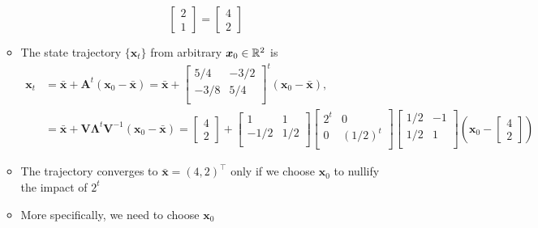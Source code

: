 \documentclass[12pt,a4paper]{article}
\begin{document}
\begin{itemize}
\begin{itemize}
\begin{equation}
\begin{bmatrix}
        2 \\
        1
      \end{bmatrix}
      =
      \begin{bmatrix}
        4 \\
        2
      \end{bmatrix}
    \end{equation}
  \item The state trajectory $\{\bm{x}_{t}\}$ from arbitrary $\bm{x}_{0}\in \mathbb{R}^{2}$ is
    \begin{align}
      \bm{x}_{t}
      & = \bar{\bm{x}} + \bm{A}^{t}(\bm{x}_{0}-\bar{\bm{x}})
        = \bar{\bm{x}} +
        \begin{bmatrix}
          5/4 & -3/2 \\
          -3/8 & 5/4 \\
        \end{bmatrix}^{t}        
        (\bm{x}_{0}-\bar{\bm{x}}),
        \nonumber \\
        & =
        \bar{\bm{x}}
        +
        \bm{V}\bm{\Lambda}^{t}\bm{V}^{-1}(\bm{x}_{0}-\bar{\bm{x}})
        =
        \begin{bmatrix} 4 \\ 2 \end{bmatrix}
        +
      \begin{bmatrix}
        1 & 1 \\
        -1/2 & 1/2 \\
      \end{bmatrix}
      \begin{bmatrix}
        2^{t} & 0 \\
        0 & (1/2)^{t} \\
      \end{bmatrix}
      \begin{bmatrix}
        1/2 & -1 \\
        1/2 & 1 \\
      \end{bmatrix}
      \left(\bm{x}_{0} - \begin{bmatrix} 4 \\ 2 \end{bmatrix}\right)
    \nonumber%
    \end{align}
    \item
      The trajectory converges to $\bar{\bm{x}}=(4, 2)^{\top}$
      only if we choose $\bm{x}_{0}$
      to nullify the impact of $2^{t}$
    \item More specifically, we need to choose $\bm{x}_{0}$

\end{itemize}
\end{itemize}
\end{document}

